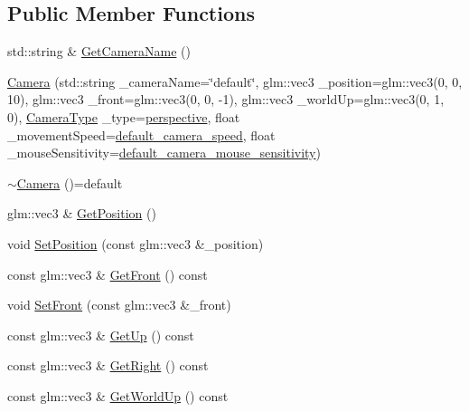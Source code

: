 \subsection*{Public Member Functions}
\begin{DoxyCompactItemize}
\item 
std\+::string \& \mbox{\hyperlink{classpiolot_1_1_camera_ae4322f03375c71eae72b7238a1c4ac12}{Get\+Camera\+Name}} ()
\item 
\mbox{\hyperlink{classpiolot_1_1_camera_a7c525f53bc93d1627261d40674e96104}{Camera}} (std\+::string \+\_\+camera\+Name=\char`\"{}default\char`\"{}, glm\+::vec3 \+\_\+position=glm\+::vec3(0, 0, 10), glm\+::vec3 \+\_\+front=glm\+::vec3(0, 0, -\/1), glm\+::vec3 \+\_\+world\+Up=glm\+::vec3(0, 1, 0), \mbox{\hyperlink{namespacepiolot_a8ffac0a73d973fb66879963da5defc90}{Camera\+Type}} \+\_\+type=\mbox{\hyperlink{namespacepiolot_a8ffac0a73d973fb66879963da5defc90a2306e17263193ee4e70fe9756faef528}{perspective}}, float \+\_\+movement\+Speed=\mbox{\hyperlink{namespacepiolot_ad09978d4f33e2559089adbc964c31992}{default\+\_\+camera\+\_\+speed}}, float \+\_\+mouse\+Sensitivity=\mbox{\hyperlink{namespacepiolot_a748a31cf105e50f2a20ccaba5fd374d3}{default\+\_\+camera\+\_\+mouse\+\_\+sensitivity}})
\item 
\mbox{\hyperlink{classpiolot_1_1_camera_a0d693a4be11bfc98a2cb46c4363ed00f}{$\sim$\+Camera}} ()=default
\item 
glm\+::vec3 \& \mbox{\hyperlink{classpiolot_1_1_camera_a9c12125ca134fdf776a296c0fac4a79f}{Get\+Position}} ()
\item 
void \mbox{\hyperlink{classpiolot_1_1_camera_a84ff7b1edc39841dddc485fb9e641bf1}{Set\+Position}} (const glm\+::vec3 \&\+\_\+position)
\item 
const glm\+::vec3 \& \mbox{\hyperlink{classpiolot_1_1_camera_a6a428b0f65c9f2b3b5c5c028a96fb1f7}{Get\+Front}} () const
\item 
void \mbox{\hyperlink{classpiolot_1_1_camera_a6151125f42016135376a60182acb63ef}{Set\+Front}} (const glm\+::vec3 \&\+\_\+front)
\item 
const glm\+::vec3 \& \mbox{\hyperlink{classpiolot_1_1_camera_a9ce10517ad9161abf65b827d1884d785}{Get\+Up}} () const
\item 
const glm\+::vec3 \& \mbox{\hyperlink{classpiolot_1_1_camera_a970d1203b54bb2323f9cbb994366d3b4}{Get\+Right}} () const
\item 
const glm\+::vec3 \& \mbox{\hyperlink{classpiolot_1_1_camera_afe3908486ce13772bf593a666869667a}{Get\+World\+Up}} () const
\item 

\end{DoxyCompactItemize}
